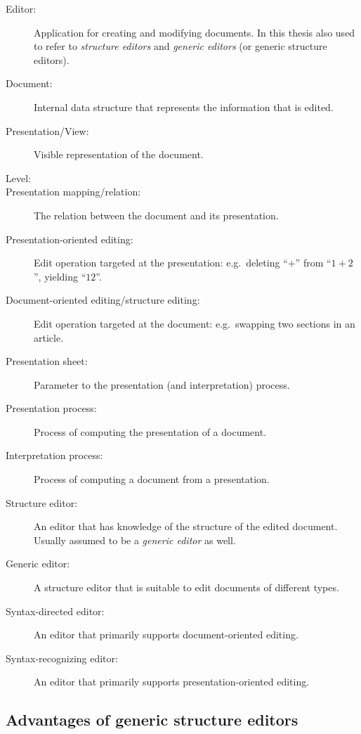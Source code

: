 \begin{description}
\item[Editor:] Application for creating and modifying documents. In this thesis also used to refer to {\em structure editors} and {\em generic editors} (or generic structure editors).
\item[Document:] Internal data structure that represents the information that is edited.
\item[Presentation/View:] Visible representation of the document.
\item[Level:]
\item[Presentation mapping/relation:] The relation between the document and its presentation.
\item[Presentation-oriented editing:] Edit operation targeted at the presentation: e.g.\ deleting ``\;$+$\;'' from ``$1+2$'', yielding ``$12$''.
\item[Document-oriented editing/structure editing:] Edit operation targeted at the document: e.g.\ swapping two sections in an article.
\item[Presentation sheet:] Parameter to the presentation (and interpretation) process. 
\item[Presentation process:] Process of computing the presentation of a document.
\item[Interpretation process:] Process of computing a document from a presentation.
\item[Structure editor:] An editor that has knowledge of the structure of the edited document. Usually assumed to be a {\em generic editor} as well.
\item[Generic editor:] A structure editor that is suitable to edit documents of different types.
\item[Syntax-directed editor:] An editor that primarily supports document-oriented editing.
\item[Syntax-recognizing editor:] An editor that primarily supports presentation-oriented editing.
\end{description} 


%								
\subsection{Advantages of generic structure editors}

